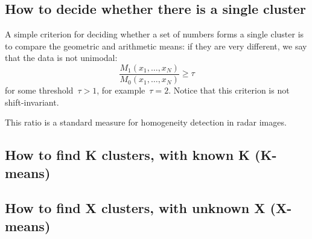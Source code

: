 \documentclass[a4paper]{article}
\begin{document}
\subsection{How to decide whether there is a single cluster}

A simple criterion for deciding whether a set of numbers forms a
single cluster is to compare the geometric and arithmetic means: if
they are very different, we say that the data is not unimodal:
\[
	\frac{M_1(x_1,\ldots,x_N)}{M_0(x_1,\ldots,x_N)} \ge \tau
\]
for some threshold~$\tau>1$, for example~$\tau=2$.  Notice that this
criterion is not shift-invariant.

This ratio is a standard measure for homogeneity detection in radar
images.

\subsection{How to find K clusters, with known K (K-means)}

\subsection{How to find X clusters, with unknown X (X-means)}
\end{document}
